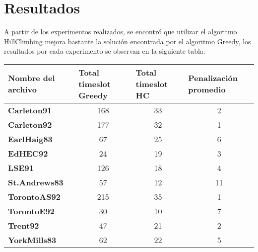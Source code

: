 \section{Resultados}
A partir de los experimentos realizados, se encontró que utilizar el algoritmo HillClimbing mejora bastante la solución encontrada por el algoritmo Greedy, los resultados por cada experimento se observan en la siguiente tabla:
\begin{table}[H]
\begin{tabular}{|l|c|c|c|}
\hline
Nombre del archivo    & \multicolumn{1}{l|}{Total timeslot Greedy} & \multicolumn{1}{l|}{Total timeslot HC} & \multicolumn{1}{l|}{Penalización promedio} \\ \hline \hline
\textbf{Carleton91}   & 168                                        & 33                                     & 2                                          \\ \hline
\textbf{Carleton92}   & 177                                        & 32                                     & 1                                          \\ \hline
\textbf{EarlHaig83}   & 67                                         & 25                                     & 6                                          \\ \hline
\textbf{EdHEC92}      & 24                                         & 19                                     & 3                                          \\ \hline
\textbf{LSE91}        & 126                                        & 18                                     & 4                                          \\ \hline
\textbf{St.Andrews83} & 57                                         & 12                                     & 11                                         \\ \hline
\textbf{TorontoAS92}  & 215                                        & 35                                     & 1                                          \\ \hline
\textbf{TorontoE92}   & 30                                         & 10                                     & 7                                          \\ \hline
\textbf{Trent92}      & 47                                         & 21                                     & 2                                          \\ \hline
\textbf{YorkMills83}  & 62                                         & 22                                     & 5                                          \\ \hline
\end{tabular}
\end{table}


